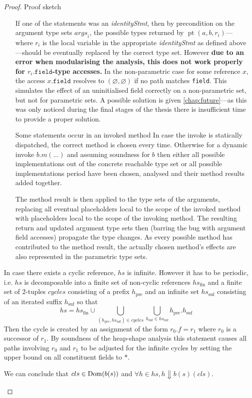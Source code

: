\begin{proof}{Proof sketch}
\begin{case}
\begin{enumerate}[label=\textbf{Case 2.\arabic*:},itemindent=*]
        If one of the statements was an \emph{identityStmt}, then by precondition on the argument type sets $\mathit{args}_i$, the possible types returned by $\operatorname{pt}(a,b,r_i)$---where $r_i$ is the local variable in the appropriate \emph{identityStmt} as defined above---should be eventually replaced by the correct type set. However \textbf{due to an error when modularising the analysis, this does not work properly for $r_i.\mathtt{field}$-type accesses.} In the non-parametric case for some reference $x$, the access $x.\mathtt{field}$ resolves to $(\varnothing, \varnothing)$ if no path matches \texttt{field}. This simulates the effect of an uninitialised field correctly on a non-parametric set, but not for parametric sets. A possible solution is given \cref{chap:future}---as this was only noticed during the final stages of the thesis there is insufficient time to provide a proper solution.
        \item[Some statements occur in an invoked method]
        In case the invoke is statically dispatched, the correct method is chosen every time. Otherwise for a dynamic invoke $b.m(...)$ and assuming soundness for $b$ then either all possible implementations out of the concrete reachable type set or all possible implementations period have been chosen, analysed and their method results added together.
        
        The method result is then applied to the type sets of the arguments, replacing all eventual placeholders local to the scope of the invoked method with placeholders local to the scope of the invoking method. The resulting return and updated argument type sets then (barring the bug with argument field accesses) propagate the type changes. As every possible method has contributed to the method result, the actually chosen method's effects are also represented in the parametric type sets.
    \end{enumerate}
    
    In case there exists a cyclic reference, $hs$ is infinite. However it has to be periodic, i.e. $hs$ is decomposable into a finite set of non-cyclic references $hs_\text{fin}$ and a finite set of 2-tuples $\mathit{cycles}$ consisting of a prefix $h_\text{pre}$ and an infinite set $hs_\text{suf}$ consisting of an iterated suffix $h_\text{suf}$
    so that \[ hs = hs_\text{fin} \cup \bigcup_{(h_\text{pre}, hs_\text{suf}) \in \mathit{cycles}} \bigcup_{h_\text{suf} \in hs_\text{suf}} h_\text{pre}.h_\text{suf}\]
    Then the cycle is created by an assignment of the form $r_0.f = r_1$ where $r_0$ is a successor of $r_1$. By soundness of the heap-shape analysis this statement causes all paths involving $r_0$ and $r_1$ to be adjusted for the infinite cycles by setting the upper bound on all constituent fields to $*$. 
    
    We can conclude that $cls \in \operatorname{Dom}(b(s))$ and $\forall h \in hs, h \Downarrow b(s)(cls)$.
    
    
\end{case}
\end{proof}
